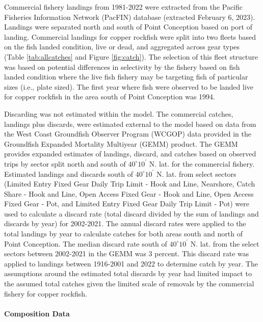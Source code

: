 \documentclass[11pt,
  letterpaper,
]{article}
\begin{document}
Commercial fishery landings from 1981-2022 were extracted from the Pacific Fisheries Information Network (PacFIN) database (extracted February 6, 2023). Landings were separated north and south of Point Conception based on port of landing. Commercial landings for copper rockfish were split into two fleets based on the fish landed condition, live or dead, and aggregated across gear types (Table \ref{tab:allcatches} and Figure \ref{fig:catch}). The selection of this fleet structure was based on potential differences in selectivity by the fishery based on fish landed condition where the live fish fishery may be targeting fish of particular sizes (i.e., plate sized). The first year where fish were observed to be landed live for copper rockfish in the area south of Point Conception was 1994.

Discarding was not estimated within the model. The commercial catches, landings plus discards, were estimated external to the model based on data from the West Coast Groundfish Observer Program (WCGOP) data provided in the Groundfish Expanded Mortality Multiyear (GEMM) product. The GEMM provides expanded estimates of landings, discard, and catches based on observed trips by sector split north and south of $40^\circ 10^\prime$ N. lat. for the commercial fishery. Estimated landings and discards south of $40^\circ 10^\prime$ N. lat. from select sectors (Limited Entry Fixed Gear Daily Trip Limit - Hook and Line, Nearshore, Catch Share - Hook and Line, Open Access Fixed Gear - Hook and Line, Open Access Fixed Gear - Pot, and Limited Entry Fixed Gear Daily Trip Limit - Pot) were used to calculate a discard rate (total discard divided by the sum of landings and discards by year) for 2002-2021. The annual discard rates were applied to the total landings by year to calculate catches for both areas south and north of Point Conception. The median discard rate south of $40^\circ 10^\prime$ N. lat. from the select sectors between 2002-2021 in the GEMM was 3 percent. This discard rate was applied to landings between 1916-2001 and 2022 to determine catch by year. The assumptions around the estimated total discards by year had limited impact to the assumed total catches given the limited scale of removals by the commercial fishery for copper rockfish.

\paragraph{Composition Data}\label{composition-data}

\hfill\break
\end{document}
